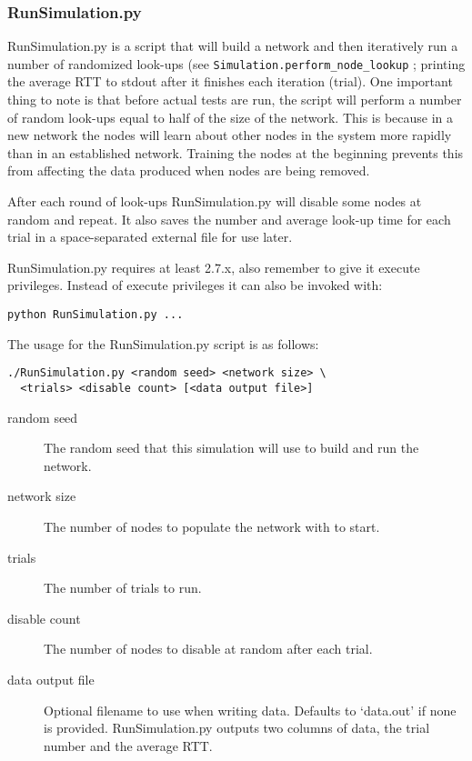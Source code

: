 \documentclass[notitlepage,12pt]{article}
\begin{document}
\subsubsection{RunSimulation.py}
\label{sec:runsim}
RunSimulation.py is a script that will build a network and then iteratively run
a number of randomized look-ups (see
\texttt{Simulation.perform\_node\_lookup}
; printing the average RTT to stdout after it finishes each
iteration (trial). One important thing to note is that before actual tests are
run, the script will perform a number of random look-ups equal to half of the
size of the network. This is because in a new network the nodes will learn about
other nodes in the system more rapidly than in an established network. Training
the nodes at the beginning prevents this from affecting the data produced when
nodes are being removed.

After each round of look-ups RunSimulation.py will disable some nodes at
random and repeat. It also saves the number and average look-up time for each
trial in a space-separated external file for use later.

RunSimulation.py requires at least 2.7.x, also remember to give it execute
privileges. Instead of execute privileges it can also be invoked with:
\begin{verbatim}
python RunSimulation.py ...
\end{verbatim}

The usage for the RunSimulation.py script is as follows:

\begin{verbatim}
./RunSimulation.py <random seed> <network size> \
  <trials> <disable count> [<data output file>]
\end{verbatim}

\begin{description}
\item[random seed] The random seed that this simulation will use to build and
  run the network.
\item[network size] The number of nodes to populate the network with to start.
\item[trials] The number of trials to run.
\item[disable count] The number of nodes to disable at random after each trial.
\item[data output file] Optional filename to use when writing data. Defaults to
  `data.out' if none is provided. RunSimulation.py outputs two columns of data,
  the trial number and the average RTT.
\end{description}
\end{document}
